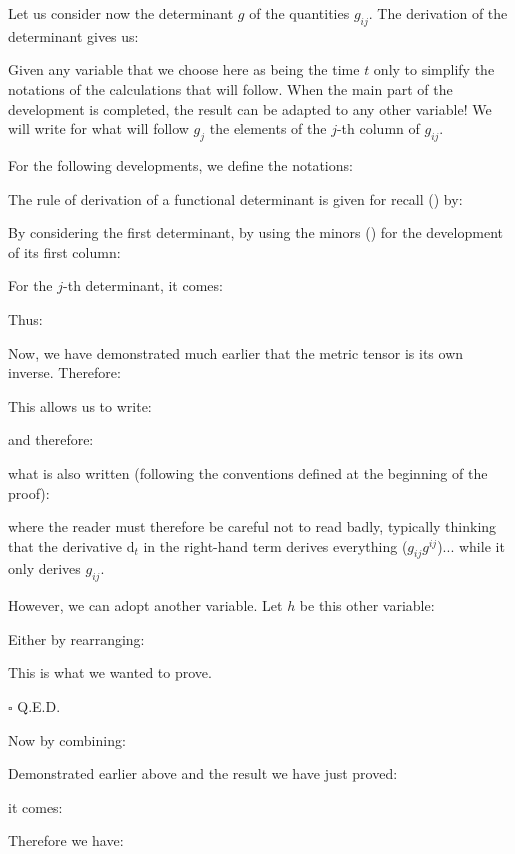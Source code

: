 	\begin{theorem}
	Let us consider now the determinant $g$ of the quantities $g_{ij}$. The derivation of the determinant gives us:
	
	\end{theorem}
	\begin{dem}
	Given any variable that we choose here as being the time $t$ only to simplify the notations of the calculations that will follow. When the main part of the development is completed, the result can be adapted to any other variable! We will write for what will follow $g_j$ the elements of the $j$-th column of $g_{ij}$.

	For the following developments, we define the notations:
	
	The rule of derivation of a functional determinant is given for recall () by:
	
	By considering the first determinant, by using the minors () for the development of its first column:
	
	For the $j$-th determinant, it comes:
	
	Thus:
	
	Now, we have demonstrated much earlier that the metric tensor is its own inverse. Therefore:
	
	This allows us to write:
	
	and therefore:
	
	what is also written (following the conventions defined at the beginning of the proof):
	
	where the reader must therefore be careful not to read badly, typically thinking that the derivative $\mathrm{d}_t$ in the right-hand term derives everything ($g_{ij}g^{ij}$)... while it only derives $g_{ij}$.
	
	However, we can adopt another variable. Let $h$ be this other variable:
	
	Either by rearranging:
	
	This is what we wanted to prove.
	\begin{flushright}
		$\square$  Q.E.D.
	\end{flushright}
	\end{dem}
	Now by combining:
	
	Demonstrated earlier above and the result we have just proved:
	
	it comes:
	
	Therefore we have:
	
